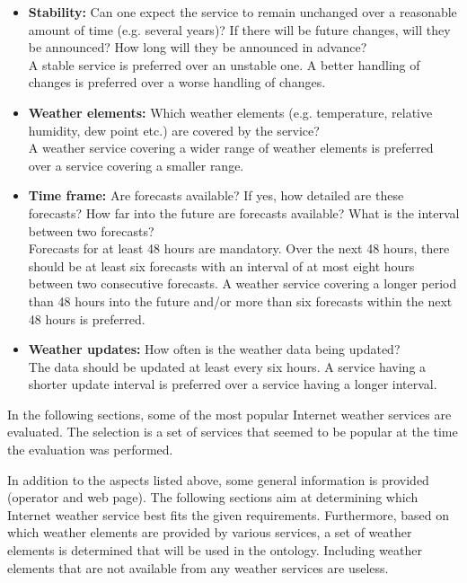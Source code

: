 \begin{itemize}
  \item \textbf{Stability:} Can one expect the service to remain unchanged over a reasonable amount of time (e.g. several years)? If there will be future changes, will they be announced? How long will they be announced in advance?\\
  A stable service is preferred over an unstable one. A better handling of changes is preferred over a worse handling of changes.
  
  \item \textbf{Weather elements:} Which weather elements (e.g. temperature, relative humidity, dew point etc.) are covered by the service?\\
  A weather service covering a wider range of weather elements is preferred over a service covering a smaller range.
  
  \item \textbf{Time frame:} Are forecasts available? If yes, how detailed are these forecasts? How far into the future are forecasts available? What is the interval between two forecasts?\\
  Forecasts for at least 48 hours are mandatory. Over the next 48 hours, there should be at least six forecasts with an interval of at most eight hours between two consecutive forecasts. A weather service covering a longer period than 48 hours into the future and/or more than six forecasts within the next 48 hours is preferred.
  
  \item \textbf{Weather updates:} How often is the weather data being updated?\\
  The data should be updated at least every six hours. A service having a shorter update interval is preferred over a service having a longer interval.
\end{itemize}

In the following sections, some of the most popular Internet weather services are evaluated. The selection is a set of services that seemed to be popular at the time the evaluation was performed.

In addition to the aspects listed above, some general information is provided (operator and web page). The following sections aim at determining which Internet weather service best fits the given requirements. Furthermore, based on which weather elements are provided by various services, a set of weather elements is determined that will be used in the ontology.
Including weather elements that are not available from any weather services are useless. %

